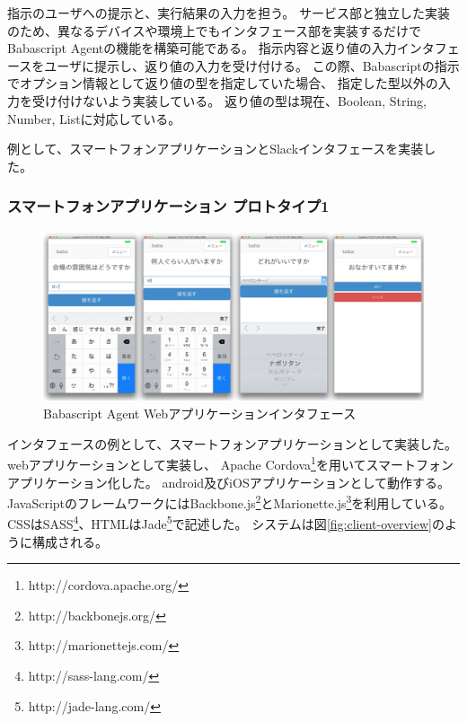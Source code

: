 指示のユーザへの提示と、実行結果の入力を担う。
サービス部と独立した実装のため、異なるデバイスや環境上でもインタフェース部を実装するだけでBabascript
Agentの機能を構築可能である。
指示内容と返り値の入力インタフェースをユーザに提示し、返り値の入力を受け付ける。
この際、Babascriptの指示でオプション情報として返り値の型を指定していた場合、
指定した型以外の入力を受け付けないよう実装している。
返り値の型は現在、Boolean, String, Number, Listに対応している。

例として、スマートフォンアプリケーションとSlackインタフェースを実装した。

\subsubsection{スマートフォンアプリケーション
プロトタイプ1}\label{ux30b9ux30deux30fcux30c8ux30d5ux30a9ux30f3ux30a2ux30d7ux30eaux30b1ux30fcux30b7ux30e7ux30f3-ux30d7ux30edux30c8ux30bfux30a4ux30d71}

\begin{figure}[htbp]
  \begin{center}
  \includegraphics[width=.8\linewidth,bb=0 0 1019 454]{images/interface_list.png}
  \end{center}
  \caption{Babascript Agent Webアプリケーションインタフェース}
  \label{fig:client_format_list}
\end{figure}

インタフェースの例として、スマートフォンアプリケーションとして実装した。
webアプリケーションとして実装し、 Apache
Cordova\footnote{http://cordova.apache.org/}を用いてスマートフォンアプリケーション化した。
android及びiOSアプリケーションとして動作する。
JavaScriptのフレームワークにはBackbone.js\footnote{http://backbonejs.org/}とMarionette.js\footnote{http://marionettejs.com/}を利用している。
CSSはSASS\footnote{http://sass-lang.com/}、HTMLはJade\footnote{http://jade-lang.com/}で記述した。
システムは図\ref{fig:client-overview}のように構成される。


